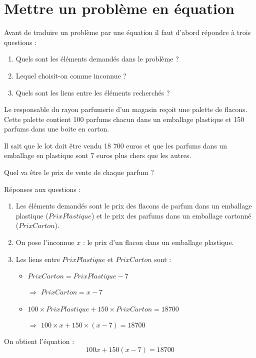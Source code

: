 \documentclass[12pt,a4paper]{article}
\begin{document}
\section{Mettre un problème en équation}

\begin{mymeth}
	Avant de traduire un problème par une équation il faut d'abord répondre à trois questions :
	\begin{enumerate}
		\item Quels sont les éléments demandés dans le problème ?
		\item Lequel choisit-on comme inconnue ?
		\item Quels sont les liens entre les éléments recherchés ?
	\end{enumerate}
\end{mymeth}

\begin{myact}{5}
	Le responsable du rayon parfumerie d’un magasin reçoit une palette de flacons. Cette palette contient 100 parfums chacun dans un emballage plastique et 150 parfums dans une boite en carton. 
	
	Il sait que le lot doit être vendu 18 700 euros et que les parfums dans un emballage en plastique sont 7 euros plus chers que les autres.
	 
	Quel va être le prix de vente de chaque parfum ?
	
\end{myact}

\begin{myrep}
	Réponses aux questions :
	\begin{enumerate}
		\item Les éléments demandés sont le prix des flacons de parfum dans un emballage plastique ($PrixPlastique$) et le prix des parfums dans un emballage cartonné ($PrixCarton$).
		\item On pose l'inconnue $x$ : le prix d'un flacon dans un emballage plastique.
		\item Les liens entre $PrixPlastique$ et $PrixCarton$ sont :
			\begin{itemize}
				\item $PrixCarton = PrixPlastique - 7$
				\item[$\Rightarrow$] $PrixCarton = x - 7$
				\item $100 \times PrixPlastique + 150 \times PrixCarton = 18700$
				\item[$\Rightarrow$] $100 \times x + 150 \times (x - 7) = 18700$ 
			\end{itemize}
	\end{enumerate}
	
	On obtient l'équation :
	\begin{equation*}
		100x + 150(x-7) = 18700
	\end{equation*}
\end{myrep}
\end{document}
